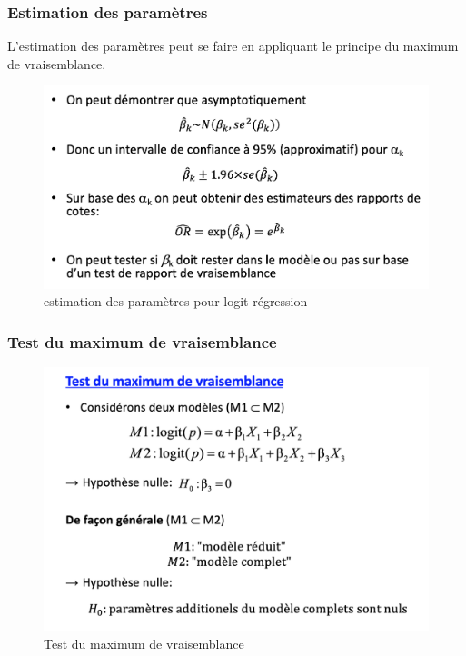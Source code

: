 \subsubsection{Estimation des paramètres}
L’estimation des paramètres peut se faire en appliquant le principe du maximum de vraisemblance. 
\begin{figure}[H]
    \centering
    \includegraphics[scale =0.5]{images/estimation_logit.png}
    \caption{estimation des paramètres pour logit régression}
    \label{fig:my_label}
\end{figure}
\subsubsection{Test du maximum de vraisemblance}

\begin{figure}[H]
    \centering
    \includegraphics[scale = 0.5]{images/test_vraisemblance.png}
    \caption{Test du maximum de vraisemblance}
    \label{fig:my_label}
\end{figure}
